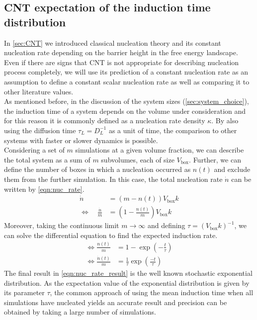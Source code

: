 \subsection{CNT expectation of the induction time distribution}
\label{sec:induction_time_expectation}
In \autoref{sec:CNT} we introduced classical nucleation theory and its constant nucleation rate depending on the barrier height in the free energy landscape. Even if there are signs that CNT is not appropriate for describing nucleation process completely, we will use its prediction of a constant nucleation rate as an assumption to define a constant scalar nucleation rate as well as comparing it to other literature values.\\

As mentioned before, in the discussion of the system sizes (\autoref{sec:system_choice}), the induction time of a system depends on the volume under consideration and for this reason it is commonly defined as a nucleation rate density $\kappa$. By also using the diffusion time $\tau_L = D_L^{-1}$ as a unit of time, the comparison to other systems with faster or slower dynamics is possible.\\

Considering a set of $m$ simulations at a given volume fraction, we can describe the total system as a sum of $m$ subvolumes, each of size $V_{\text{box}}$. Further, we can define the number of boxes in which a nucleation occurred as $n(t)$ and exclude them from the further simulation. In this case, the total nucleation rate $ \dot{n} $ can be written by \autoref{eqn:nuc_rate}.
\begin{align}
\label{eqn:nuc_rate}
\dot{n} &= (m - n(t))V_{\text{box}}k\\
\Leftrightarrow \quad \!\frac{\dot{n}}{m} &= \left(1 - \frac{n(t)}{m}\right) V_{\text{box}}k
\end{align}
Moreover, taking the continuous limit $m \rightarrow \infty $ and defining $\tau = (V_{\text{box}} k)^{-1}$, we can solve the differential equation to find the expected induction rate. 
\begin{align}
\Leftrightarrow \frac{n(t)}{m} &= 1 - \exp\left( -\frac{t}{\tau} \right)\\
\label{eqn:nuc_rate_result}
\Leftrightarrow \frac{\dot{n}(t)}{m} &= \frac{1}{\tau} \exp\left( \frac{-t}{\tau} \right) 
\end{align}
The final result in \autoref{eqn:nuc_rate_result} is the well known stochastic exponential distribution. As the expectation value of the exponential distribution is given by its parameter $\tau$, the common approach of using the mean induction time when all simulations have nucleated yields an accurate result and precision can be obtained by taking a large number of simulations.
